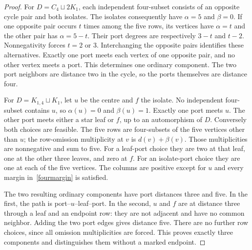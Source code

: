 \documentclass[11pt]{article}
\newcommand{\sq}{\sqcup}
\begin{document}
\begin{proof}
For $D=C_4\sq2K_1$, each independent four-subset consists of an
opposite cycle pair and both isolates. The isolates consequently have
$\alpha=5$ and $\beta=0$. If one opposite pair occurs $t$ times among
the five rows, its vertices have $\alpha=t$ and the other pair has
$\alpha=5-t$. Their port degrees are respectively $3-t$ and $t-2$.
Nonnegativity forces $t=2$ or $3$. Interchanging the opposite pairs
identifies these alternatives. Exactly one port meets each vertex of
one opposite pair, and no other vertex meets a port. This determines
one ordinary component. The two port neighbors are distance two in
the cycle, so the ports themselves are distance four.

For $D=K_{1,4}\sq K_1$, let $u$ be the centre and $f$ the isolate.
No independent four-subset contains $u$, so $\alpha(u)=0$ and
$\beta(u)=1$. Exactly one port meets $u$. The other port meets either
a star leaf or $f$, up to an automorphism of $D$. Conversely both
choices are feasible. The five rows are four-subsets of the five
vertices other than $u$; the row-omission multiplicity at $v$ is
$d(v)+\beta(v)$. Those multiplicities are nonnegative and sum to five.
For a leaf-port choice they are two at that leaf, one at the other
three leaves, and zero at $f$. For an isolate-port choice they are
one at each of the five vertices. The columns are positive except
for $u$ and every margin in~\eqref{fourmargin} is satisfied.

The two resulting ordinary components have port distances three and
five. In the first, the path is port--$u$--leaf--port. In the second,
$u$ and $f$ are at distance three through a leaf and an endpoint row:
they are not adjacent and have no common neighbor. Adding the two
port edges gives distance five. There are no further row choices,
since all omission multiplicities are forced. This proves exactly
three components and distinguishes them without a marked endpoint.
\end{proof}
\end{document}
